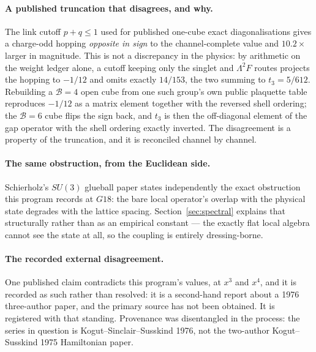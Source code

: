 \documentclass[11pt]{article}
\theoremstyle{definition}
\theoremstyle{remark}
\newcommand{\chk}[1]{}
\begin{document}
\paragraph{A published truncation that disagrees, and why.} The link cutoff
$p+q\le1$ used for published one-cube exact diagonalisations gives a
charge-odd hopping \emph{opposite in sign} to the channel-complete value and
$10.2\times$ larger in magnitude. This is not a discrepancy in the physics: by
arithmetic on the weight ledger alone, a cutoff keeping only the singlet and
$\Lambda^2F$ routes projects the hopping to $-1/12$ and omits exactly $14/153$,
the two summing to $t_3=5/612$. Rebuilding a $\mathcal B=4$ open cube from one
such group's own public plaquette table reproduces $-1/12$ as a matrix element
together with the reversed shell ordering; the $\mathcal B=6$ cube flips the
sign back, and $t_3$ is then the off-diagonal element of the gap operator with
the shell ordering exactly inverted. The disagreement is a property of the
truncation, and it is reconciled channel by channel.\chk{FINDING: the B = 6 cube flips the sign back to +5/612, closing the decisive test}

\paragraph{The same obstruction, from the Euclidean side.} Schierholz's
$SU(3)$ glueball paper states independently the exact obstruction this program
records at $G18$: the bare local operator's overlap with the physical state
degrades with the lattice spacing. Section~\ref{sec:spectral} explains that
structurally rather than as an empirical constant --- the exactly flat local
algebra cannot see the state at all, so the coupling is entirely
dressing-borne.\chk{the overlap obstruction was published in 1988, and it scales}

\paragraph{The recorded external disagreement.} One published claim contradicts
this program's values, at $x^3$ and $x^4$, and it is recorded as such rather
than resolved: it is a second-hand report about a 1976 three-author paper, and
the primary source has not been obtained. It is registered with that standing.
Provenance was disentangled in the process: the series in question is
Kogut--Sinclair--Susskind 1976, not the two-author Kogut--Susskind 1975
Hamiltonian paper.\chk{the series Hamer supersedes is Kogut-SINCLAIR-Susskind 1976, not KS 1975}
\end{document}
